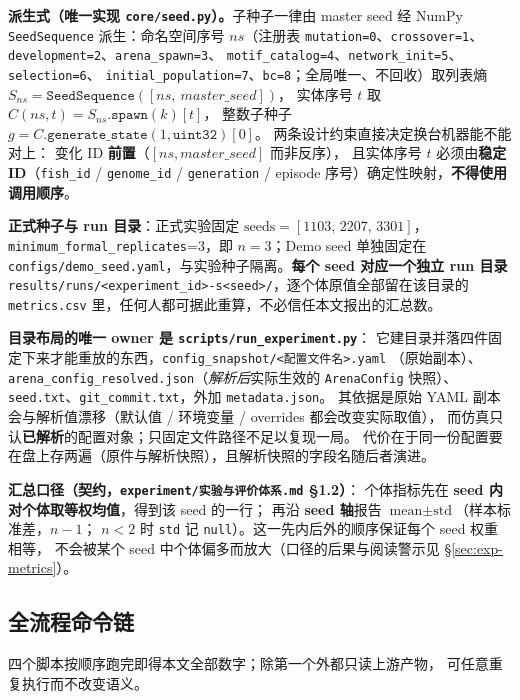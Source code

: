 \textbf{派生式（唯一实现 \texttt{core/seed.py}）。}子种子一律由 master seed 经
NumPy \texttt{SeedSequence} 派生：命名空间序号 $ns$（注册表
\texttt{mutation=0}、\texttt{crossover=1}、\texttt{development=2}、\texttt{arena\_spawn=3}、
\texttt{motif\_catalog=4}、\texttt{network\_init=5}、\texttt{selection=6}、
\texttt{initial\_population=7}、\texttt{bc=8}；全局唯一、不回收）取列表熵
$S_{ns}=\texttt{SeedSequence}([ns,\ master\_seed])$，
实体序号 $t$ 取 $C(ns,t)=S_{ns}.\texttt{spawn}(k)[t]$，
整数子种子 $g=C.\texttt{generate\_state}(1,\texttt{uint32})[0]$。
两条设计约束直接决定换台机器能不能对上：
变化 ID \textbf{前置}（$[ns, master\_seed]$ 而非反序），
且实体序号 $t$ 必须由\textbf{稳定 ID}（\texttt{fish\_id} / \texttt{genome\_id} /
\texttt{generation} / episode 序号）确定性映射，\textbf{不得使用调用顺序}。

\textbf{正式种子与 run 目录}：正式实验固定 $\text{seeds}=[1103,\,2207,\,3301]$，
\texttt{minimum\_formal\_replicates}=3，即 $n=3$；Demo seed 单独固定在
\texttt{configs/demo\_seed.yaml}，与实验种子隔离。\textbf{每个 seed 对应一个独立 run 目录}
\texttt{results/runs/<experiment\_id>-s<seed>/}，逐个体原值全部留在该目录的
\texttt{metrics.csv} 里，任何人都可据此重算，不必信任本文报出的汇总数。

\textbf{目录布局的唯一 owner 是 \texttt{scripts/run\_experiment.py}}：
它建目录并落四件固定下来才能重放的东西，\texttt{config\_snapshot/<配置文件名>.yaml}
（原始副本）、\texttt{arena\_config\_resolved.json}（\emph{解析后}实际生效的
\texttt{ArenaConfig} 快照）、\texttt{seed.txt}、\texttt{git\_commit.txt}，外加
\texttt{metadata.json}。
其依据是原始 YAML 副本会与解析值漂移（默认值 / 环境变量 / overrides 都会改变实际取值），
而仿真只认\textbf{已解析}的配置对象；只固定文件路径不足以复现一局。
代价在于同一份配置要在盘上存两遍（原件与解析快照），且解析快照的字段名随后者演进。

\textbf{汇总口径（契约，\texttt{experiment/实验与评价体系.md} \S1.2）}：
个体指标先在 \textbf{seed 内对个体取等权均值}，得到该 seed 的一行；
再沿 \textbf{seed 轴}报告 $\text{mean}\pm\text{std}$（样本标准差，$n-1$；
$n<2$ 时 \texttt{std} 记 \texttt{null}）。这一先内后外的顺序保证每个 seed 权重相等，
不会被某个 seed 中个体偏多而放大（口径的后果与阅读警示见 \S\ref{sec:exp-metrics}）。

\subsection{全流程命令链}

四个脚本按顺序跑完即得本文全部数字；除第一个外都只读上游产物，
可任意重复执行而不改变语义。

